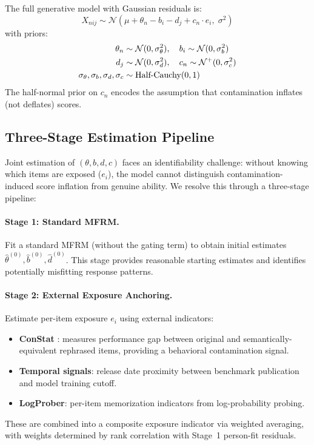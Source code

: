 \documentclass[11pt,a4paper]{article}
\begin{document}
The full generative model with Gaussian residuals is:
\begin{equation}
X_{nij} \sim \mathcal{N}\!\left(\mu + \theta_n - b_i - d_j + c_n \cdot e_i,\; \sigma^2\right)
\end{equation}
with priors:
\begin{align}
\theta_n &\sim \mathcal{N}(0, \sigma_\theta^2), \quad b_i \sim \mathcal{N}(0, \sigma_b^2) \notag\\
d_j &\sim \mathcal{N}(0, \sigma_d^2), \quad c_n \sim \mathcal{N}^+(0, \sigma_c^2) \notag\\
\sigma_\theta, \sigma_b, \sigma_d, \sigma_c &\sim \text{Half-Cauchy}(0, 1) \notag
\end{align}
The half-normal prior on $c_n$ encodes the assumption that contamination inflates (not deflates) scores.

\subsection{Three-Stage Estimation Pipeline}

Joint estimation of $(\theta, b, d, c)$ faces an identifiability challenge: without knowing which items are exposed ($e_i$), the model cannot distinguish contamination-induced score inflation from genuine ability. We resolve this through a three-stage pipeline:

\paragraph{Stage 1: Standard MFRM.} Fit a standard MFRM (without the gating term) to obtain initial estimates $\hat{\theta}^{(0)}, \hat{b}^{(0)}, \hat{d}^{(0)}$. This stage provides reasonable starting estimates and identifies potentially misfitting response patterns.

\paragraph{Stage 2: External Exposure Anchoring.} Estimate per-item exposure $e_i$ using external indicators:
\begin{itemize}[nosep]
    \item \textbf{ConStat} \citep{dekoninck2024constat}: measures performance gap between original and semantically-equivalent rephrased items, providing a behavioral contamination signal.
    \item \textbf{Temporal signals}: release date proximity between benchmark publication and model training cutoff.
    \item \textbf{LogProber}: per-item memorization indicators from log-probability probing.
\end{itemize}
These are combined into a composite exposure indicator via weighted averaging, with weights determined by rank correlation with Stage~1 person-fit residuals.
\end{document}

